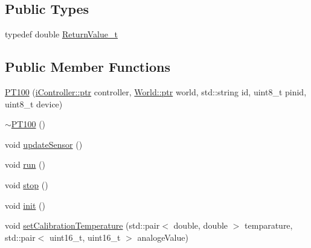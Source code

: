 \subsection*{Public Types}
\begin{DoxyCompactItemize}
\item 
typedef double \hyperlink{classo_cpt_1_1components_1_1sensors_1_1_p_t100_a385f85603cfd23bf76488f6b67e9fe2d}{Return\+Value\+\_\+t}
\end{DoxyCompactItemize}
\subsection*{Public Member Functions}
\begin{DoxyCompactItemize}
\item 
\hyperlink{classo_cpt_1_1components_1_1sensors_1_1_p_t100_aedb71224bcffefd6d43ee72458344826}{P\+T100} (\hyperlink{classo_cpt_1_1i_controller_a6d89a95cd6ad68bb74adfaca2f36370f}{i\+Controller\+::ptr} controller, \hyperlink{classo_cpt_1_1_world_aa6e591e3096d5de71e0cec9039663d67}{World\+::ptr} world, std\+::string id, uint8\+\_\+t pinid, uint8\+\_\+t device)
\item 
\hyperlink{classo_cpt_1_1components_1_1sensors_1_1_p_t100_aa6fcce0276d47e75a16f153962c57b8c}{$\sim$\+P\+T100} ()
\item 
void \hyperlink{classo_cpt_1_1components_1_1sensors_1_1_p_t100_a66619675288a5344a55242d9bf097aee}{update\+Sensor} ()
\item 
void \hyperlink{classo_cpt_1_1components_1_1sensors_1_1_p_t100_a41dfc55a4be7993949feeb5ac013690d}{run} ()
\item 
void \hyperlink{classo_cpt_1_1components_1_1sensors_1_1_p_t100_a6d80e18a58cf4e1b9b6ce82b441209e2}{stop} ()
\item 
void \hyperlink{classo_cpt_1_1components_1_1sensors_1_1_p_t100_a296d0c3c2a55df465e127462c8c30215}{init} ()
\item 
void \hyperlink{classo_cpt_1_1components_1_1sensors_1_1_p_t100_a77e36b92c5eb4b6594fa89114d0fb357}{set\+Calibration\+Temperature} (std\+::pair$<$ double, double $>$ temparature, std\+::pair$<$ uint16\+\_\+t, uint16\+\_\+t $>$ analoge\+Value)
\end{DoxyCompactItemize}
